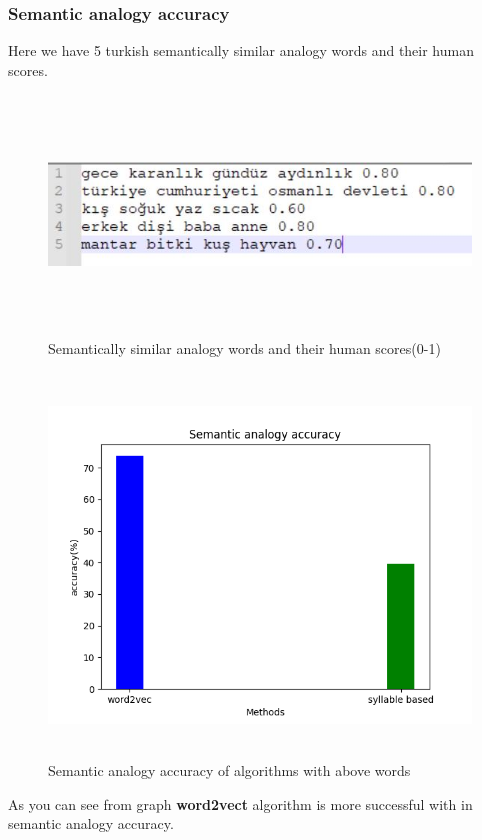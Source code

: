 \documentclass{article}
\begin{document}
\subsubsection{Semantic analogy accuracy}
Here we have 5 turkish semantically similar analogy words and their human scores.
\begin{figure}[H]
    \centering
	\includegraphics[width=5in, height=2.5in]{26.JPG}
	\caption[Optional caption]{Semantically similar analogy words and their human scores(0-1)}
	\label{}
\end{figure}
\begin{figure}[H]
    \centering
	\includegraphics[width=6in, height=4in]{sem_anal.png}
	\caption[Optional caption]{Semantic analogy accuracy of algorithms with above words}
	\label{}
\end{figure}
As you can see from graph \textbf{word2vect} algorithm is  more successful with in semantic analogy accuracy. \\
\newline
\end{document}
